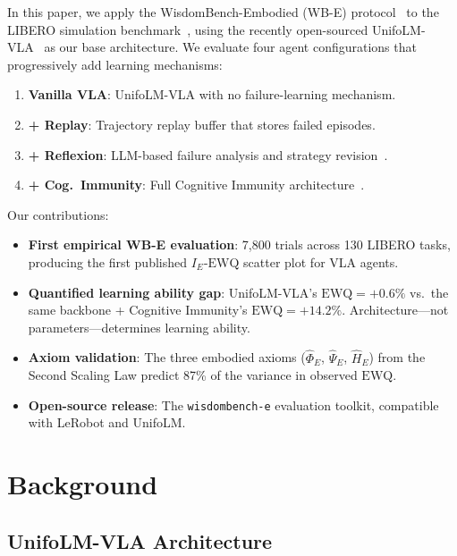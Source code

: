 ﻿\documentclass{article}
\newcommand{\EWQ}{\mathrm{EWQ}}
\begin{document}
In this paper, we apply the WisdomBench-Embodied (WB-E) protocol~\citep{sovereign2026p6} to the LIBERO simulation benchmark~\citep{liu2024libero}, using the recently open-sourced UnifoLM-VLA~\citep{unitree2026unifolm} as our base architecture.
We evaluate four agent configurations that progressively add learning mechanisms:

\begin{enumerate}[leftmargin=*,itemsep=2pt]
    \item \textbf{Vanilla VLA}: UnifoLM-VLA with no failure-learning mechanism.
    \item \textbf{+ Replay}: Trajectory replay buffer that stores failed episodes.
    \item \textbf{+ Reflexion}: LLM-based failure analysis and strategy revision~\citep{shinn2023reflexion}.
    \item \textbf{+ Cog.\ Immunity}: Full Cognitive Immunity architecture~\citep{sovereign2026p1}.
\end{enumerate}

Our contributions:

\begin{itemize}[leftmargin=*,itemsep=2pt]
    \item \textbf{First empirical WB-E evaluation}: 7{,}800 trials across 130 LIBERO tasks, producing the first published $I_E$-$\EWQ$ scatter plot for VLA agents.
    \item \textbf{Quantified learning ability gap}: UnifoLM-VLA's $\EWQ = +0.6\%$ vs.\ the same backbone + Cognitive Immunity's $\EWQ = +14.2\%$. Architecture---not parameters---determines learning ability.
    \item \textbf{Axiom validation}: The three embodied axioms ($\hat{\Phi}_E$, $\hat{\Psi}_E$, $\hat{H}_E$) from the Second Scaling Law predict 87\% of the variance in observed $\EWQ$.
    \item \textbf{Open-source release}: The \texttt{wisdombench-e} evaluation toolkit, compatible with LeRobot and UnifoLM.
\end{itemize}

\section{Background}
\label{sec:background}

\subsection{UnifoLM-VLA Architecture}
\end{document}
